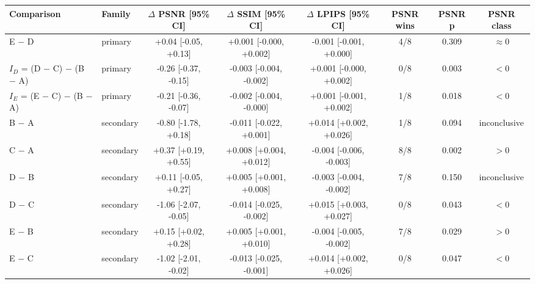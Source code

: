 \begin{tabular}{llcccccc}
\toprule
Comparison & Family & $\Delta$ PSNR [95\% CI] & $\Delta$ SSIM [95\% CI] & $\Delta$ LPIPS [95\% CI] & PSNR wins & PSNR p & PSNR class \\
\midrule
E $-$ D & primary & +0.04 [-0.05, +0.13] & +0.001 [-0.000, +0.002] & -0.001 [-0.001, +0.000] & 4/8 & 0.309 & $\approx$0 \\
$I_D$ = (D $-$ C) $-$ (B $-$ A) & primary & -0.26 [-0.37, -0.15] & -0.003 [-0.004, -0.002] & +0.001 [-0.000, +0.002] & 0/8 & 0.003 & $<$0 \\
$I_E$ = (E $-$ C) $-$ (B $-$ A) & primary & -0.21 [-0.36, -0.07] & -0.002 [-0.004, -0.000] & +0.001 [-0.001, +0.002] & 1/8 & 0.018 & $<$0 \\
B $-$ A & secondary & -0.80 [-1.78, +0.18] & -0.011 [-0.022, +0.001] & +0.014 [+0.002, +0.026] & 1/8 & 0.094 & inconclusive \\
C $-$ A & secondary & +0.37 [+0.19, +0.55] & +0.008 [+0.004, +0.012] & -0.004 [-0.006, -0.003] & 8/8 & 0.002 & $>$0 \\
D $-$ B & secondary & +0.11 [-0.05, +0.27] & +0.005 [+0.001, +0.008] & -0.003 [-0.004, -0.002] & 7/8 & 0.150 & inconclusive \\
D $-$ C & secondary & -1.06 [-2.07, -0.05] & -0.014 [-0.025, -0.002] & +0.015 [+0.003, +0.027] & 0/8 & 0.043 & $<$0 \\
E $-$ B & secondary & +0.15 [+0.02, +0.28] & +0.005 [+0.001, +0.010] & -0.004 [-0.005, -0.002] & 7/8 & 0.029 & $>$0 \\
E $-$ C & secondary & -1.02 [-2.01, -0.02] & -0.013 [-0.025, -0.001] & +0.014 [+0.002, +0.026] & 0/8 & 0.047 & $<$0 \\
\bottomrule
\end{tabular}
